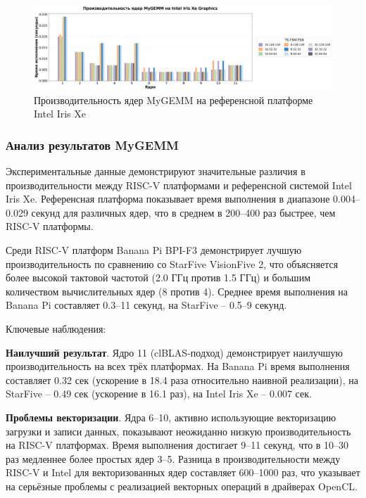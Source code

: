 \begin{figure}[H]
\centering
\includegraphics[width=1\textwidth]{figures/intel_xe.png}
\caption{Производительность ядер MyGEMM на референсной платформе Intel Iris Xe}
\label{fig:perf_intelxe}
\end{figure}

\subsubsection{Анализ результатов MyGEMM}

Экспериментальные данные демонстрируют значительные различия в производительности между RISC-V платформами и референсной системой Intel Iris Xe. Референсная платформа показывает время выполнения в диапазоне 0.004--0.029 секунд для различных ядер, что в среднем в 200--400 раз быстрее, чем RISC-V платформы.

Среди RISC-V платформ Banana Pi BPI-F3 демонстрирует лучшую производительность по сравнению со StarFive VisionFive 2, что объясняется более высокой тактовой частотой (2.0 ГГц против 1.5 ГГц) и большим количеством вычислительных ядер (8 против 4). Среднее время выполнения на Banana Pi составляет 0.3--11 секунд, на StarFive -- 0.5--9 секунд.

Ключевые наблюдения:

\textbf{Наилучший результат}. Ядро 11 (clBLAS-подход) демонстрирует наилучшую производительность на всех трёх платформах. На Banana Pi время выполнения составляет 0.32 сек (ускорение в 18.4 раза относительно наивной реализации), на StarFive -- 0.49 сек (ускорение в 16.1 раз), на Intel Iris Xe -- 0.007 сек.

\textbf{Проблемы векторизации}. Ядра 6--10, активно использующие векторизацию загрузки и записи данных, показывают неожиданно низкую производительность на RISC-V платформах. Время выполнения достигает 9--11 секунд, что в 10--30 раз медленнее более простых ядер 3--5. Разница в производительности между RISC-V и Intel для векторизованных ядер составляет 600--1000 раз, что указывает на серьёзные проблемы с реализацией векторных операций в драйверах OpenCL.

